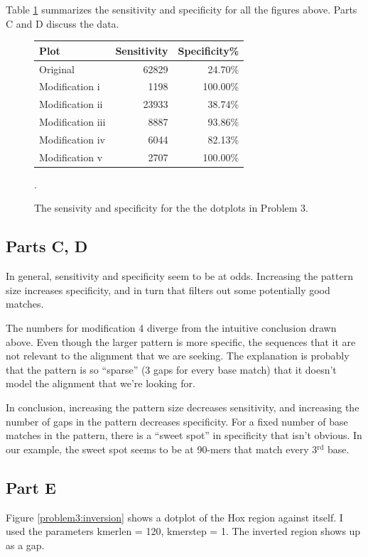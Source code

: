 Table \ref{problem3:hitstable} summarizes the sensitivity and specificity for
all the figures above. Parts C and D discuss the data.

\begin{figure}[htb]
\center\begin{tabular}{|l|r|r|}
\hline
Plot & Sensitivity & Specificity\% \\
\hline
Original & 62829 & 24.70\% \\
\hline
Modification i & 1198 & 100.00\% \\
\hline
Modification ii & 23933 & 38.74\% \\
\hline
Modification iii & 8887 & 93.86\% \\
\hline
Modification iv & 6044 & 82.13\% \\
\hline
Modification v & 2707 & 100.00\% \\
\hline
\end{tabular}
\caption{The sensivity and specificity for the the dotplots in Problem 3.}
\label{problem3:hitstable}.
\end{figure}

\subsection {Parts C, D}

In general, sensitivity and specificity seem to be at odds. Increasing the
pattern size increases specificity, and in turn that filters out some
potentially good matches.

The numbers for modification 4 diverge from the intuitive conclusion drawn
above. Even though the larger pattern is more specific, the sequences that
it are not relevant to the alignment that we are seeking. The explanation is
probably that the pattern is so ``sparse'' (3 gaps for every base match) that
it doesn't model the alignment that we're looking for.

In conclusion, increasing the pattern size decreases sensitivity, and
increasing the number of gaps in the pattern decreases specificity. For a fixed
number of base matches in the pattern, there is a ``sweet spot'' in
specificity that isn't obvious. In our example, the sweet spot seems to be at
90-mers that match every 3$^\textrm{rd}$ base.


\subsection {Part E}

Figure \ref{problem3:inversion} shows a dotplot of the Hox region against
itself. I used the parameters kmerlen = 120, kmerstep = 1. The inverted region
shows up as a gap.

